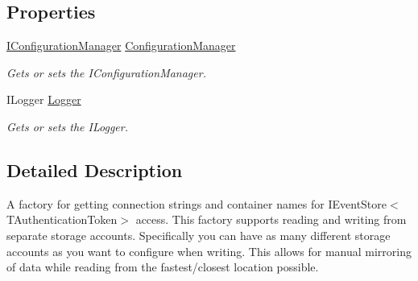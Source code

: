 \subsection*{Properties}
\begin{DoxyCompactItemize}
\item 
\hyperlink{interfaceCqrs_1_1Configuration_1_1IConfigurationManager}{I\+Configuration\+Manager} \hyperlink{classCqrs_1_1Azure_1_1BlobStorage_1_1Events_1_1TableStorageEventStoreConnectionStringFactory_a3787d14bf40a1756c742b0640413a62e_a3787d14bf40a1756c742b0640413a62e}{Configuration\+Manager}
\begin{DoxyCompactList}\small\item\em Gets or sets the I\+Configuration\+Manager. \end{DoxyCompactList}\item 
I\+Logger \hyperlink{classCqrs_1_1Azure_1_1BlobStorage_1_1Events_1_1TableStorageEventStoreConnectionStringFactory_a1324be985c77f1393a45a73dbb178314_a1324be985c77f1393a45a73dbb178314}{Logger}
\begin{DoxyCompactList}\small\item\em Gets or sets the I\+Logger. \end{DoxyCompactList}\end{DoxyCompactItemize}


\subsection{Detailed Description}
A factory for getting connection strings and container names for I\+Event\+Store$<$\+T\+Authentication\+Token$>$ access. This factory supports reading and writing from separate storage accounts. Specifically you can have as many different storage accounts as you want to configure when writing. This allows for manual mirroring of data while reading from the fastest/closest location possible. 



